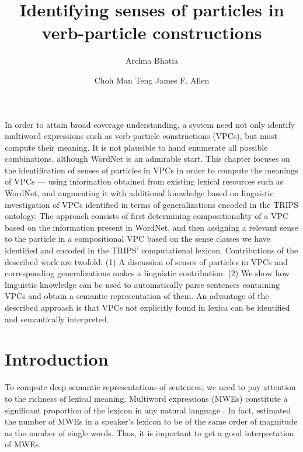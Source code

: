 \documentclass[output=paper
,modfonts
,nonflat]{langsci/langscibook}
\begin{document}
\author{
Archna Bhatia
\and
Choh Man Teng
\lastand
James F. Allen
}


\title{Identifying senses of particles in verb-particle constructions}

\abstract
{In order to attain broad coverage understanding, a system need not only identify multiword expressions such as verb-particle constructions (VPCs), but must compute their meaning. It is not plausible to hand enumerate all possible combinations, although WordNet is an admirable start. This chapter focuses on the identification of senses of particles in VPCs in order to compute the meanings of VPCs --- using information obtained from existing lexical resources such as WordNet, and augmenting it with additional knowledge based on linguistic investigation of VPCs identified in terms of generalizations encoded in the TRIPS ontology. The approach consists of first determining compositionality of a VPC based on the information present in WordNet, and then assigning a relevant sense to the particle in a compositional VPC based on the sense classes we have identified and encoded in the TRIPS' computational lexicon. Contributions of the described work are twofold: (1) A discussion of senses of particles in VPCs and corresponding generalizations makes a linguistic contribution. (2) We show how linguistic knowledge can be used to automatically parse sentences containing VPCs and obtain a semantic representation of them.  An advantage of the described approach is that VPCs not explicitly found in lexica can be identified and semantically interpreted.}

\maketitle
\label{BHATIA-CHAPTER}





\section{Introduction } \label{bha:sec:intro}
To compute deep semantic representations of sentences, we need to pay attention to the richness of lexical meaning. Multiword expressions (MWEs) constitute a significant proportion of the lexicon in any natural language \citep{Mor13}. In fact, \citet{Jac97} estimated the number of MWEs in a speaker's lexicon to be of the same order of magnitude as the number of single words. Thus, it is important to get a good interpretation of MWEs.
\end{document}
